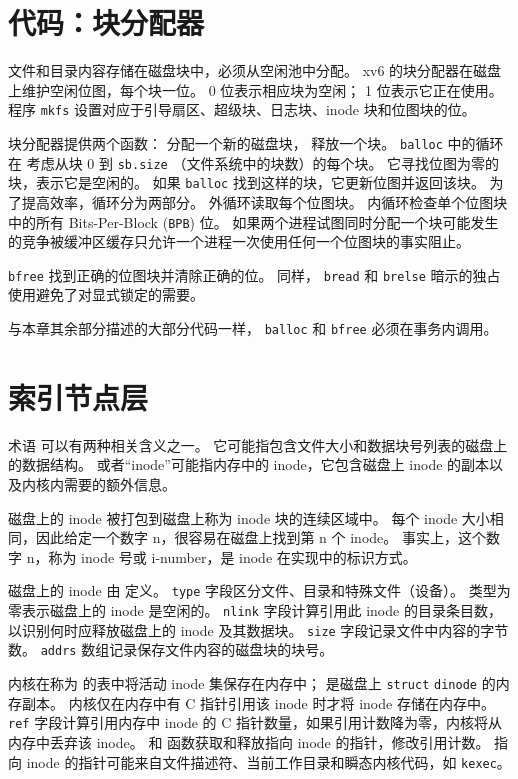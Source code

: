 \section{代码：块分配器}

文件和目录内容存储在磁盘块中，必须从空闲池中分配。
xv6 的块分配器在磁盘上维护空闲位图，每个块一位。
0 位表示相应块为空闲；
1 位表示它正在使用。
程序
\lstinline{mkfs}
设置对应于引导扇区、超级块、日志块、inode 块和位图块的位。

块分配器提供两个函数：
分配一个新的磁盘块，
释放一个块。
\lstinline{balloc}
中的循环在
考虑从块 0 到
\lstinline{sb.size}
（文件系统中的块数）的每个块。
它寻找位图为零的块，表示它是空闲的。
如果
\lstinline{balloc}
找到这样的块，它更新位图并返回该块。
为了提高效率，循环分为两部分。
外循环读取每个位图块。
内循环检查单个位图块中的所有
Bits-Per-Block (\lstinline{BPB})
位。
如果两个进程试图同时分配一个块可能发生的竞争被缓冲区缓存只允许一个进程一次使用任何一个位图块的事实阻止。

\lstinline{bfree}
找到正确的位图块并清除正确的位。
同样，
\lstinline{bread}
和
\lstinline{brelse}
暗示的独占使用避免了对显式锁定的需要。

与本章其余部分描述的大部分代码一样，
\lstinline{balloc}
和
\lstinline{bfree}
必须在事务内调用。
\section{索引节点层}

术语
可以有两种相关含义之一。
它可能指包含文件大小和数据块号列表的磁盘上的数据结构。
或者``inode''可能指内存中的 inode，它包含磁盘上 inode 的副本以及内核内需要的额外信息。

磁盘上的 inode 被打包到磁盘上称为 inode 块的连续区域中。
每个 inode 大小相同，因此给定一个数字 n，很容易在磁盘上找到第 n 个 inode。
事实上，这个数字 n，称为 inode 号或 i-number，是 inode 在实现中的标识方式。

磁盘上的 inode 由
定义。
\lstinline{type}
字段区分文件、目录和特殊文件（设备）。
类型为零表示磁盘上的 inode 是空闲的。
\lstinline{nlink}
字段计算引用此 inode 的目录条目数，以识别何时应释放磁盘上的 inode 及其数据块。
\lstinline{size}
字段记录文件中内容的字节数。
\lstinline{addrs}
数组记录保存文件内容的磁盘块的块号。

内核在称为  的表中将活动 inode 集保存在内存中；
是磁盘上
\lstinline{struct}
\lstinline{dinode}
的内存副本。
内核仅在内存中有 C 指针引用该 inode 时才将 inode 存储在内存中。
\lstinline{ref}
字段计算引用内存中 inode 的 C 指针数量，如果引用计数降为零，内核将从内存中丢弃该 inode。
和
函数获取和释放指向 inode 的指针，修改引用计数。
指向 inode 的指针可能来自文件描述符、当前工作目录和瞬态内核代码，如
\lstinline{kexec}。

